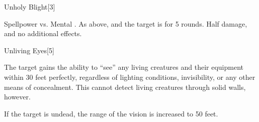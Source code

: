 \begin{spellsection}{Unholy Blight}[3]
    \begin{spellheader}
    \end{spellheader}
    \begin{spellcontent}
        \begin{spelltargetinginfo}
        \end{spelltargetinginfo}
        \begin{spelleffects}
            \begin{spellattack}{Spellpower vs. Mental}
                \spellsuccess {}.
                \spellcritical As above, and the target is \staggered for 5 rounds.
                \spellfailure Half damage, and no additional effects.
            \end{spellattack}
        \end{spelleffects}
    \end{spellcontent}
    \begin{spellfooter}
        \miscastrandom
    \end{spellfooter}
\end{spellsection}

\begin{spellsection}{Unliving Eyes}[5]
    \begin{spellheader}
    \end{spellheader}
    \begin{spellcontent}
        \begin{spelltargetinginfo}
        \end{spelltargetinginfo}
        \begin{spelleffects}
            \spelleffect The target gains the ability to ``see'' any living creatures and their equipment within 30 feet perfectly, regardless of lighting conditions, invisibility, or any other means of concealment. This cannot detect living creatures through solid walls, however.

            If the target is undead, the range of the vision is increased to 50 feet.
            \spelldur \durpersonallong
        \end{spelleffects}
    \end{spellcontent}
    \begin{spellfooter}
        \miscastexplode
    \end{spellfooter}
\end{spellsection}

